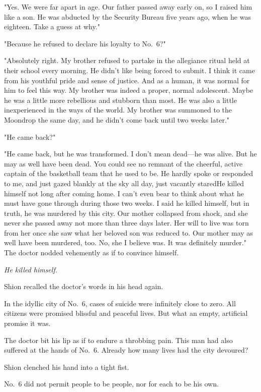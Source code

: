 "Yes. We were far apart in age. Our father passed away early on, so I
raised him like a son. He was abducted by the Security Bureau five years
ago, when he was eighteen. Take a guess at why."

"Because he refused to declare his loyalty to No.~6?"

"Absolutely right. My brother refused to partake in the allegiance
ritual held at their school every morning. He didn't like being forced
to submit. I think it came from his youthful pride and sense of justice.
And as a human, it was normal for him to feel this way. My brother was
indeed a proper, normal adolescent. Maybe he was a little more
rebellious and stubborn than most. He was also a little inexperienced in
the ways of the world. My brother was summoned to the Moondrop the same
day, and he didn't come back until two weeks later."

"He came back?"

"He came back, but he was transformed. I don't mean dead---he was alive.
But he may as well have been dead. You could see no remnant of the
cheerful, active captain of the basketball team that he used to be. He
hardly spoke or responded to me, and just gazed blankly at the sky all
day, just vacantly stared\el He killed himself not long after coming
home. I can't even bear to think about what he must have gone through
during those two weeks. I said he killed himself, but in truth, he was
murdered by this city. Our mother collapsed from shock, and she never\el 
she passed away not more than three days later. Her will to live was
torn from her once she saw what her beloved son was reduced to. Our
mother may as well have been murdered, too. No, she I believe was. It
was definitely murder." The doctor nodded vehemently as if to convince
himself.

\emph{He killed himself.}

Shion recalled the doctor's words in his head again.

In the idyllic city of No.~6, cases of suicide were infinitely close to
zero. All citizens were promised blissful and peaceful lives. But what
an empty, artificial promise it was.

The doctor bit his lip as if to endure a throbbing pain. This man had
also suffered at the hands of No.~6. Already how many lives had the city
devoured?

Shion clenched his hand into a tight fist.

No.~6 did not permit people to be people, nor for each to be his own.

